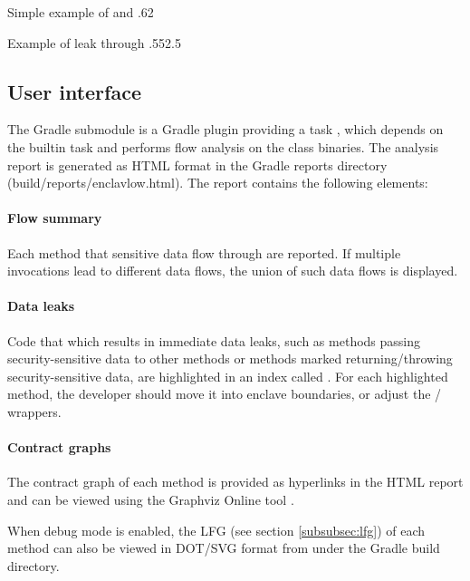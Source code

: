 {Simple example of  and }{.6}{2}

{Example of leak through }{.55}{2.5}

\subsection{User interface}\label{subsec:user-interface}
The  Gradle submodule
is a Gradle plugin providing a task ,
which depends on the  builtin task
and performs flow analysis on the class binaries.
The analysis report is generated as HTML format in the Gradle reports directory
(build/reports/enclavlow.html).
The report contains the following elements:

\paragraph{Flow summary}
Each method that sensitive data flow through are reported.
If multiple invocations lead to different data flows,
the union of such data flows is displayed.

\paragraph{Data leaks}
Code that which results in immediate data leaks,
such as methods passing security-sensitive data to other  methods
or methods marked  returning/throwing security-sensitive data,
are highlighted in an index called .
For each highlighted method, the developer
should move it into enclave boundaries,
or adjust the / wrappers.

\paragraph{Contract graphs}
The contract graph of each method is provided as hyperlinks in the HTML report
and can be viewed using the Graphviz Online tool \cite{dreampuf}.

When debug mode is enabled, the \ac{LFG} (see section \ref{subsubsec:lfg})
of each method can also be viewed in DOT/SVG format from 
under the Gradle build directory.

